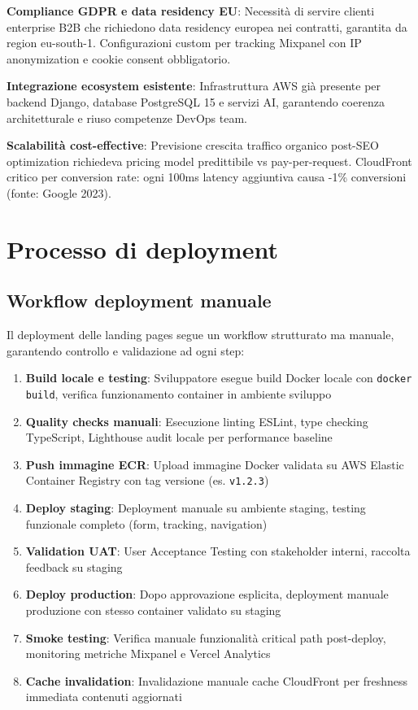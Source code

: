 \textbf{Compliance GDPR e data residency EU}: Necessità di servire clienti enterprise B2B che richiedono data residency europea nei contratti, garantita da region eu-south-1. Configurazioni custom per tracking Mixpanel con IP anonymization e cookie consent obbligatorio.

\textbf{Integrazione ecosystem esistente}: Infrastruttura AWS già presente per backend Django, database PostgreSQL 15 e servizi AI, garantendo coerenza architetturale e riuso competenze DevOps team.

\textbf{Scalabilità cost-effective}: Previsione crescita traffico organico post-SEO optimization richiedeva pricing model predittibile vs pay-per-request. CloudFront critico per conversion rate: ogni 100ms latency aggiuntiva causa -1\% conversioni (fonte: Google 2023).

\section{Processo di deployment}

\subsection{Workflow deployment manuale}

Il deployment delle landing pages segue un workflow strutturato ma manuale, garantendo controllo e validazione ad ogni step:

\begin{enumerate}
  \item \textbf{Build locale e testing}: Sviluppatore esegue build Docker locale con \texttt{docker build}, verifica funzionamento container in ambiente sviluppo
  
  \item \textbf{Quality checks manuali}: Esecuzione linting ESLint, type checking TypeScript, Lighthouse audit locale per performance baseline
  
  \item \textbf{Push immagine ECR}: Upload immagine Docker validata su AWS Elastic Container Registry con tag versione (es. \texttt{v1.2.3})
  
  \item \textbf{Deploy staging}: Deployment manuale su ambiente staging, testing funzionale completo (form, tracking, navigation)
  
  \item \textbf{Validation UAT}: User Acceptance Testing con stakeholder interni, raccolta feedback su staging
  
  \item \textbf{Deploy production}: Dopo approvazione esplicita, deployment manuale produzione con stesso container validato su staging
  
  \item \textbf{Smoke testing}: Verifica manuale funzionalità critical path post-deploy, monitoring metriche Mixpanel e Vercel Analytics
  
  \item \textbf{Cache invalidation}: Invalidazione manuale cache CloudFront per freshness immediata contenuti aggiornati
\end{enumerate}

